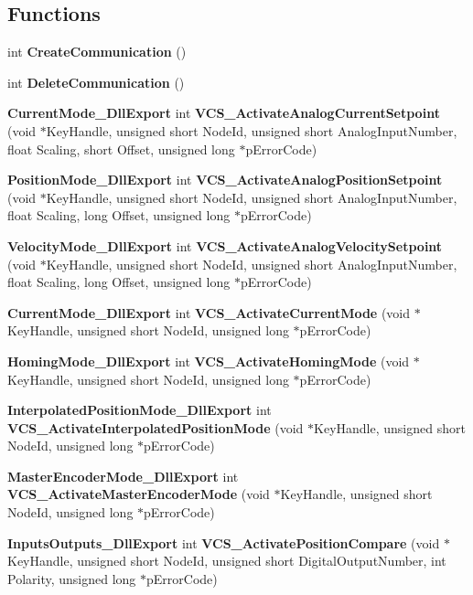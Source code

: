 \subsection*{\-Functions}
\begin{DoxyCompactItemize}
\item 
int {\bf \-Create\-Communication} ()
\item 
int {\bf \-Delete\-Communication} ()
\item 
{\bf \-Current\-Mode\-\_\-\-Dll\-Export} int {\bf \-V\-C\-S\-\_\-\-Activate\-Analog\-Current\-Setpoint} (void $\ast$\-Key\-Handle, unsigned short \-Node\-Id, unsigned short \-Analog\-Input\-Number, float \-Scaling, short \-Offset, unsigned long $\ast$p\-Error\-Code)
\item 
{\bf \-Position\-Mode\-\_\-\-Dll\-Export} int {\bf \-V\-C\-S\-\_\-\-Activate\-Analog\-Position\-Setpoint} (void $\ast$\-Key\-Handle, unsigned short \-Node\-Id, unsigned short \-Analog\-Input\-Number, float \-Scaling, long \-Offset, unsigned long $\ast$p\-Error\-Code)
\item 
{\bf \-Velocity\-Mode\-\_\-\-Dll\-Export} int {\bf \-V\-C\-S\-\_\-\-Activate\-Analog\-Velocity\-Setpoint} (void $\ast$\-Key\-Handle, unsigned short \-Node\-Id, unsigned short \-Analog\-Input\-Number, float \-Scaling, long \-Offset, unsigned long $\ast$p\-Error\-Code)
\item 
{\bf \-Current\-Mode\-\_\-\-Dll\-Export} int {\bf \-V\-C\-S\-\_\-\-Activate\-Current\-Mode} (void $\ast$\-Key\-Handle, unsigned short \-Node\-Id, unsigned long $\ast$p\-Error\-Code)
\item 
{\bf \-Homing\-Mode\-\_\-\-Dll\-Export} int {\bf \-V\-C\-S\-\_\-\-Activate\-Homing\-Mode} (void $\ast$\-Key\-Handle, unsigned short \-Node\-Id, unsigned long $\ast$p\-Error\-Code)
\item 
{\bf \-Interpolated\-Position\-Mode\-\_\-\-Dll\-Export} \*
int {\bf \-V\-C\-S\-\_\-\-Activate\-Interpolated\-Position\-Mode} (void $\ast$\-Key\-Handle, unsigned short \-Node\-Id, unsigned long $\ast$p\-Error\-Code)
\item 
{\bf \-Master\-Encoder\-Mode\-\_\-\-Dll\-Export} int {\bf \-V\-C\-S\-\_\-\-Activate\-Master\-Encoder\-Mode} (void $\ast$\-Key\-Handle, unsigned short \-Node\-Id, unsigned long $\ast$p\-Error\-Code)
\item 
{\bf \-Inputs\-Outputs\-\_\-\-Dll\-Export} int {\bf \-V\-C\-S\-\_\-\-Activate\-Position\-Compare} (void $\ast$\-Key\-Handle, unsigned short \-Node\-Id, unsigned short \-Digital\-Output\-Number, int \-Polarity, unsigned long $\ast$p\-Error\-Code)

\end{DoxyCompactItemize}
